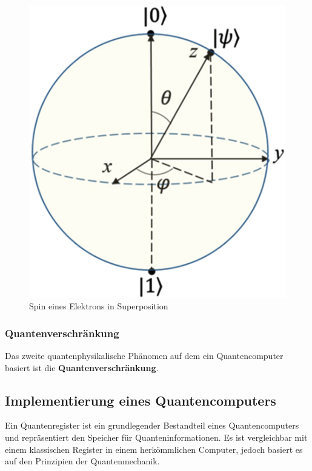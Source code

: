 \begin{figure}[!hbt]
    \centering
    \includegraphics{./images/spin-superpostition.jpg}
    \caption{Spin eines Elektrons in Superposition \cite{noauthor_cpb_27_9_090308_f8jpg_nodate}}
    \label{fig:spin}
\end{figure}

\subsubsection{Quantenverschränkung}
Das zweite quantenphysikalische Phänomen auf dem ein Quantencomputer basiert ist die \textbf{Quantenverschränkung}. 

\subsection{Implementierung eines Quantencomputers}



Ein Quantenregister ist ein grundlegender Bestandteil eines Quantencomputers und repräsentiert den Speicher für Quanteninformationen. Es ist vergleichbar mit einem klassischen Register in einem herkömmlichen Computer, jedoch basiert es auf den Prinzipien der Quantenmechanik.

